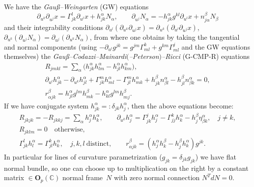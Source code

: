 \documentclass[pdftex]{sigma}
\begin{document}
We have the {\it Gau\ss--Weingarten} (GW) equations
\[
\partial_{u^k}\partial_{u^j}x=\Gamma_{jk}^l\partial_{u^l}x+h_{jk}^{\alpha}N_{\alpha},\qquad
\partial_{u^j}N_{\alpha}=
-h_{jk}^{\alpha}g^{kl}\partial_{u^l}x+n^{\beta}_{j\alpha}N_{\beta}
\]
and their integrability conditions
$\partial_{u^l}(\partial_{u^k}\partial_{u^j}x)=\partial_{u^k}(\partial_{u^l}\partial_{u^j}x)$,
$\partial_{u^k}(\partial_{u^j}N_{\alpha})=\partial_{u^j}(\partial_{u^k}N_{\alpha})$, from
where one obtains by taking the tangential and normal components
(using
$-\partial_{u^l}g^{jk}=g^{jm}\Gamma_{ml}^k+g^{km}\Gamma_{ml}^j$
and the GW equations themselves) the {\it
Gau\ss--Codazzi--Mainardi$($--Peterson$)$--Ricci} \mbox{(G-CMP-R)} equations
\begin{gather*}
R_{jmkl}=\sum_{\alpha}\big(h_{jk}^{\alpha}h_{lm}^{\alpha}-h_{jl}^{\alpha}h_{km}^{\alpha}\big),\\
\partial_{u^l}h_{jk}^{\alpha}-\partial_{u^k}h_{jl}^{\alpha}
+\Gamma_{jk}^mh_{ml}^{\alpha}-\Gamma_{jl}^mh_{mk}^{\alpha}
+h_{jk}^{\beta}n_{\beta l}^{\alpha}-h_{jl}^{\beta}n_{\beta
k}^{\alpha}=0,
\\
r_{\alpha
jk}^{\beta}=h_{jl}^{\alpha}g^{lm}h_{mk}^{\beta}-h_{kl}^{\alpha}g^{lm}h_{mj}^{\beta}.
\end{gather*}
If we have conjugate system
$h_{jk}^{\alpha}=:\delta_{jk}h_j^{\alpha}$, then the above
equations become:
\begin{gather}
R_{jkjk}=-R_{jkkj}=\sum_{\alpha}h_j^{\alpha}h_k^{\alpha},\qquad
\partial_{u^k}h_j^{\alpha}=\Gamma_{jk}^jh_j^{\alpha}-\Gamma_{jj}^kh_k^{\alpha}-h_j^{\beta}\eta_{\beta
k}^{\alpha},\quad j\neq k,\nonumber\\
R_{jklm}=0\quad \mathrm{otherwise},\nonumber\\
\Gamma_{jk}^lh_l^{\alpha}=\Gamma_{jl}^kh_k^{\alpha},\quad  j,k,l\
\mathrm{distinct},\qquad r_{\alpha
jk}^{\beta}=(h_j^{\alpha}h_k^{\beta}-h_j^{\beta}h_k^{\alpha})g^{jk}.\label{eq:riem}
\end{gather}
In particular for lines of curvature parametrization
($g_{jk}=\delta_{jk}g_{jk}$) we have f\/lat normal bundle, so one
can choose up to multiplication on the right by a constant matrix
$\in\mathbf{O}_p(\mathbb{C})$ normal frame~$N$ with zero normal
connection $N^TdN=0$.
\end{document}
